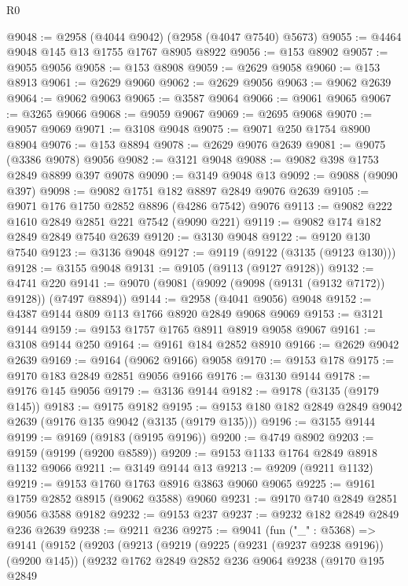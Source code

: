 \begin{lexlean}{R0}
\begin{coremodule}
@9048 := @2958 (@4044 @9042) (@2958 (@4047 @7540) @5673)
@9055 := @4464 @9048 @145 @13 @1755 @1767 @8905 @8922
@9056 := @153 @8902
@9057 := @9055 @9056
@9058 := @153 @8908
@9059 := @2629 @9058
@9060 := @153 @8913
@9061 := @2629 @9060
@9062 := @2629 @9056
@9063 := @9062 @2639
@9064 := @9062 @9063
@9065 := @3587 @9064
@9066 := @9061 @9065
@9067 := @3265 @9066
@9068 := @9059 @9067
@9069 := @2695 @9068
@9070 := @9057 @9069
@9071 := @3108 @9048
@9075 := @9071 @250 @1754 @8900 @8904
@9076 := @153 @8894
@9078 := @2629 @9076 @2639
@9081 := @9075 (@3386 @9078) @9056
@9082 := @3121 @9048
@9088 := @9082 @398 @1753 @2849 @8899 @397 @9078
@9090 := @3149 @9048 @13
@9092 := @9088 (@9090 @397)
@9098 := @9082 @1751 @182 @8897 @2849 @9076 @2639
@9105 := @9071 @176 @1750 @2852 @8896 (@4286 @7542) @9076
@9113 := @9082 @222 @1610 @2849 @2851 @221 @7542 (@9090 @221)
@9119 := @9082 @174 @182 @2849 @2849 @7540 @2639
@9120 := @3130 @9048
@9122 := @9120 @130 @7540
@9123 := @3136 @9048
@9127 := @9119 (@9122 (@3135 (@9123 @130)))
@9128 := @3155 @9048
@9131 := @9105 (@9113 (@9127 @9128))
@9132 := @4741 @220
@9141 := @9070 (@9081 (@9092 (@9098 (@9131 (@9132 @7172)) @9128)) (@7497 @8894))
@9144 := @2958 (@4041 @9056) @9048
@9152 := @4387 @9144 @809 @113 @1766 @8920 @2849 @9068 @9069
@9153 := @3121 @9144
@9159 := @9153 @1757 @1765 @8911 @8919 @9058 @9067
@9161 := @3108 @9144 @250
@9164 := @9161 @184 @2852 @8910
@9166 := @2629 @9042 @2639
@9169 := @9164 (@9062 @9166) @9058
@9170 := @9153 @178
@9175 := @9170 @183 @2849 @2851 @9056 @9166
@9176 := @3130 @9144
@9178 := @9176 @145 @9056
@9179 := @3136 @9144
@9182 := @9178 (@3135 (@9179 @145))
@9183 := @9175 @9182
@9195 := @9153 @180 @182 @2849 @2849 @9042 @2639 (@9176 @135 @9042 (@3135 (@9179 @135)))
@9196 := @3155 @9144
@9199 := @9169 (@9183 (@9195 @9196))
@9200 := @4749 @8902
@9203 := @9159 (@9199 (@9200 @8589))
@9209 := @9153 @1133 @1764 @2849 @8918 @1132 @9066
@9211 := @3149 @9144 @13
@9213 := @9209 (@9211 @1132)
@9219 := @9153 @1760 @1763 @8916 @3863 @9060 @9065
@9225 := @9161 @1759 @2852 @8915 (@9062 @3588) @9060
@9231 := @9170 @740 @2849 @2851 @9056 @3588 @9182
@9232 := @9153 @237
@9237 := @9232 @182 @2849 @2849 @236 @2639
@9238 := @9211 @236
@9275 := @9041
    (fun ("_" : @5368) =>
    @9141
      (@9152
        (@9203
          (@9213
            (@9219
              (@9225 (@9231 (@9237 @9238 @9196)) (@9200 @145))
              (@9232
                @1762
                @2849
                @2852
                @236
                @9064
                @9238
                (@9170
                  @195
                  @2849

\end{coremodule}
\end{lexlean}
